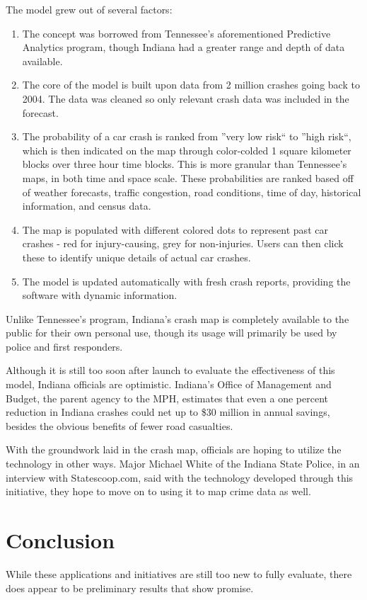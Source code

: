 \documentclass[sigconf]{acmart}
\begin{document}
The model grew out of several factors:
\begin{enumerate}
    \item The concept was borrowed from Tennessee's aforementioned Predictive Analytics program, though Indiana had a greater range and depth of data available. 
    \item The core of the model is built upon data from 2 million crashes going back to 2004. The data was cleaned so only relevant crash data was included in the forecast.
    \item The probability of a car crash is ranked from ''very low risk`` to ''high risk``, which is then indicated on the map through color-colded 1 square kilometer blocks over three hour time blocks.\cite{statescoop} This is more granular than Tennessee's maps, in both time and space scale. These probabilities are ranked based off of weather forecasts, traffic congestion, road conditions, time of day, historical information, and census data. 
    \item The map is populated with different colored dots to represent past car crashes - red for injury-causing, grey for non-injuries. Users can then click these to identify unique details of actual car crashes.\cite{govtech}
    \item The model is updated automatically with fresh crash reports, providing the software with dynamic information.
\end{enumerate}

Unlike Tennessee's program, Indiana's crash map is completely available to the public for their own personal use, though its usage will primarily be used by police and first responders. 

Although it is still too soon after launch to evaluate the effectiveness of this model, Indiana officials are optimistic. Indiana's Office of Management and Budget, the parent agency to the MPH, estimates that even a one percent reduction in Indiana crashes could net up to \$30 million in annual savings, besides the obvious benefits of fewer road casualties. 

With the groundwork laid in the crash map, officials are hoping to utilize the technology in other ways. Major Michael White of the Indiana State Police, in an interview with Statescoop.com, said with the technology developed through this initiative, they hope to move on to using it to map crime data as well.\cite{statescoop}

\section{Conclusion}
While these applications and initiatives are still too new to fully evaluate, there does appear to be preliminary results that show promise. 
\end{document}
